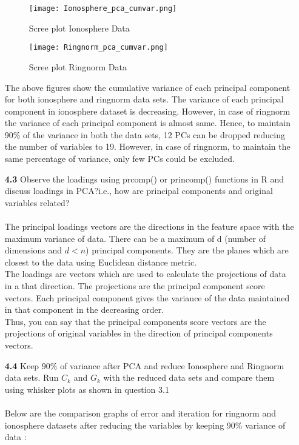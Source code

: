 \documentclass{article}
\begin{document}
\begin{enumerate}
\begin{figure}[H]
      \texttt{[image: Ionosphere\_pca\_cumvar.png]}
      \caption{Scree plot Ionosphere Data}
  	\end{figure}
    
    \begin{figure}[H]
      \texttt{[image: Ringnorm\_pca\_cumvar.png]}
      \caption{Scree plot Ringnorm Data}
  	\end{figure}
The above figures show the cumulative variance of each principal component for both ionosphere and ringnorm data sets. 
The variance of each principal component in ionosphere dataset is decreasing. However, in case of ringnorm the variance of each principal component is almost same. Hence, to maintain 90\% of the variance in both the data sets, 12 PCs can be dropped reducing the number of variables to 19. However, in case of ringnorm, to maintain the same percentage of variance, only few PCs could be excluded.




  \item[\textbf{4.3}]  Observe the loadings using prcomp() or princomp() functions in R and  discuss loadings in PCA?i.e., how are principal components and original variables related?\\
\\
The principal loadings vectors are the directions in the feature space with the maximum variance of data. There can be a maximum of d (number of dimensions and $d < n$) principal components. They are the planes which are closest to the data using Euclidean distance metric.\\
The loadings are vectors which are used to calculate the projections of data in a that direction. The projections are the principal component score vectors. Each principal component gives the variance of the data maintained in that component in the decreasing order.\\
Thus, you can say that the principal components score vectors are the projections of original variables in the direction of principal components vectors.


  \item[\textbf{4.4}]  Keep $90\%$ of variance  after PCA and reduce Ionosphere and Ringnorm data sets.  Run $C_k$ and $G_k$ with the reduced data sets and compare them using whisker plots as shown in question 3.1\\
 \\
 Below are the comparison graphs of error and iteration for ringnorm and ionosphere datasets after reducing the variables by keeping 90\% variance of data :
  

\end{enumerate}
\end{document}
